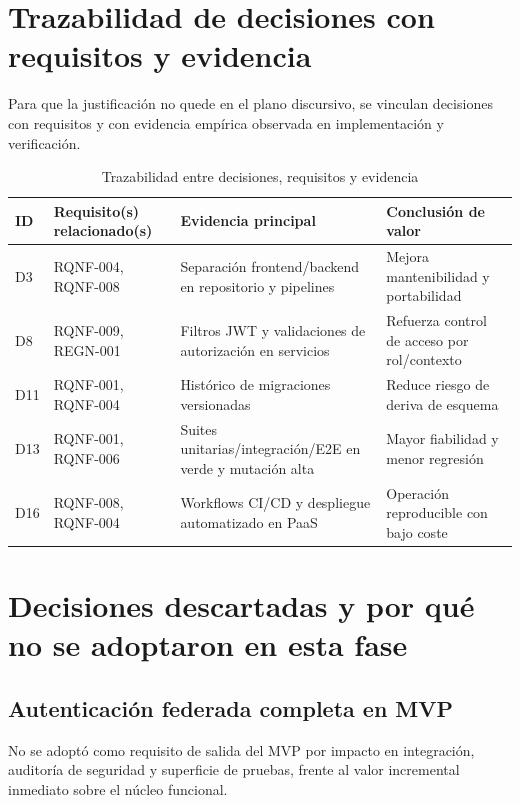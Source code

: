 \FloatBarrier
\section{Trazabilidad de decisiones con requisitos y evidencia}

Para que la justificaci\'on no quede en el plano discursivo,
se vinculan decisiones con requisitos y con evidencia emp\'irica observada
en implementaci\'on y verificaci\'on.

\begin{table}[!htbp]
\centering
\begin{tabular}{|P{1.6cm}|P{2.8cm}|P{2.9cm}|P{4.7cm}|}
\hline
\textbf{ID} & \textbf{Requisito(s) relacionado(s)} & \textbf{Evidencia principal} & \textbf{Conclusi\'on de valor} \\
\hline
D3 & RQNF-004, RQNF-008 & Separaci\'on frontend/backend en repositorio y pipelines & Mejora mantenibilidad y portabilidad \\
\hline
D8 & RQNF-009, REGN-001 & Filtros JWT y validaciones de autorizaci\'on en servicios & Refuerza control de acceso por rol/contexto \\
\hline
D11 & RQNF-001, RQNF-004 & Hist\'orico de migraciones versionadas & Reduce riesgo de deriva de esquema \\
\hline
D13 & RQNF-001, RQNF-006 & Suites unitarias/integraci\'on/E2E en verde y mutaci\'on alta & Mayor fiabilidad y menor regresi\'on \\
\hline
D16 & RQNF-008, RQNF-004 & Workflows CI/CD y despliegue automatizado en PaaS & Operaci\'on reproducible con bajo coste \\
\hline
\end{tabular}
\caption{Trazabilidad entre decisiones, requisitos y evidencia}
\label{tab:trazabilidad-decisiones}
\end{table}

\FloatBarrier
\section{Decisiones descartadas y por qu\'e no se adoptaron en esta fase}

\subsection{Autenticaci\'on federada completa en MVP}

No se adopt\'o como requisito de salida del MVP por impacto en integraci\'on,
auditor\'ia de seguridad y superficie de pruebas,
frente al valor incremental inmediato sobre el n\'ucleo funcional.

